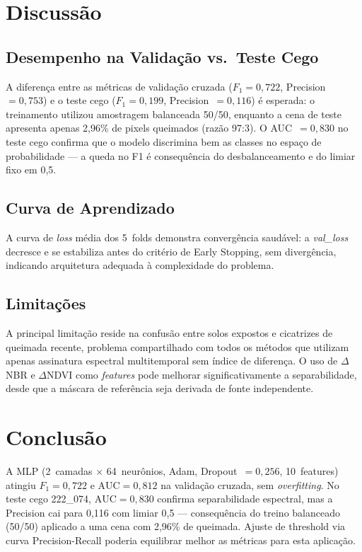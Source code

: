 \documentclass[conference]{IEEEtran}
\begin{document}
\section{Discussão}

\subsection{Desempenho na Validação vs.\ Teste Cego}

A diferença entre as métricas de validação cruzada ($F_1 = 0{,}722$,
Precision~$= 0{,}753$) e o teste cego ($F_1 = 0{,}199$, Precision~$= 0{,}116$)
é esperada: o treinamento utilizou amostragem balanceada 50/50, enquanto a
cena de teste apresenta apenas 2,96\% de pixels queimados (razão 97:3). O
AUC~$= 0{,}830$ no teste cego confirma que o modelo discrimina bem as classes
no espaço de probabilidade — a queda no F1 é consequência do desbalanceamento
e do limiar fixo em 0,5.

\subsection{Curva de Aprendizado}

A curva de \textit{loss} média dos 5~folds demonstra convergência saudável:
a \textit{val\_loss} decresce e se estabiliza antes do critério de Early
Stopping, sem divergência, indicando arquitetura adequada à complexidade
do problema.

\subsection{Limitações}

A principal limitação reside na confusão entre solos expostos e cicatrizes de
queimada recente, problema compartilhado com todos os métodos que utilizam
apenas assinatura espectral multitemporal sem índice de diferença. O uso de
$\Delta$NBR e $\Delta$NDVI como \textit{features} pode melhorar
significativamente a separabilidade, desde que a máscara de referência seja
derivada de fonte independente.

\section{Conclusão}

A MLP (2~camadas $\times$ 64~neurônios, Adam, Dropout~$= 0{,}256$,
10~features) atingiu $F_1 = 0{,}722$ e $\mathrm{AUC} = 0{,}812$ na
validação cruzada, sem \textit{overfitting}. No teste cego 222\_074,
$\mathrm{AUC} = 0{,}830$ confirma separabilidade espectral, mas a Precision
cai para 0,116 com limiar 0,5 — consequência do treino balanceado (50/50)
aplicado a uma cena com 2,96\% de queimada. Ajuste de threshold via curva
Precision-Recall poderia equilibrar melhor as métricas para esta aplicação.
\end{document}
